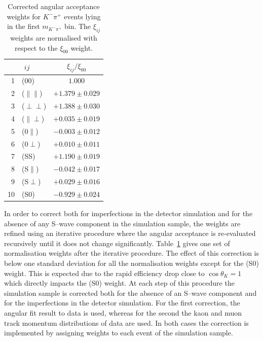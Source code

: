 \documentclass[12pt,a4paper]{article}
\def\thetaK{\ensuremath{\theta_{K}}\xspace}
\newcommand{\mkpi}{\ensuremath{m_{\Km\pip}}\xspace}
\newcommand{\Km}{\ensuremath{K^-}\xspace}
\newcommand{\pip}{\ensuremath{\pi^+}\xspace}
\newcommand{\swave}{{\rm S--wave}\xspace}
\newcommand{\tabref}[1]{Table~\ref{#1}}
\begin{document}
\begin{table}[b!]
  \center
  \caption{\small Corrected angular acceptance weights for $K^-\pi^+$ events lying in the first \mkpi bin.
                  The $\xi_{ij}$ weights are normalised with respect to the $\xi_{00}$ weight. }
 
  \begin{tabular}{r l c}
    \hline
    \multicolumn{2}{c}{$ij$}        &  $\xi_{ij}/\xi_{00}$         \\
    \hline
     1   &  (00)                    & $1.000             $\\
     2   &  ($\parallel\parallel$)  & $+1.379 \pm  0.029$   \\
     3   &  ($\perp\perp$)          & $+1.388 \pm  0.030$   \\
     4   &  ($\parallel\perp$)      & $+0.035 \pm  0.019$   \\
     5   &  (0$\parallel$)          & $-0.003 \pm  0.012$   \\
     6   &  (0$\perp$)              & $+0.010 \pm  0.011$   \\
     7   &  (SS)                    & $+1.190 \pm  0.019$   \\
     8   &  (S$\parallel$)          & $-0.042 \pm  0.017$   \\
     9   &  (S$\perp$)              & $+0.029 \pm  0.016$   \\
     10  &  (S0)                    & $-0.929 \pm  0.024$   \\
    \hline
  \end{tabular}
  \label{tab:angAccWeightsUncorr}
\end{table}
In order to correct both for imperfections in the detector simulation and for the absence of any \swave component in the
simulation sample, the weights are refined using an iterative procedure where the angular acceptance is re-evaluated
recursively until it does not change significantly. 
\tabref{tab:angAccWeightsUncorr} gives one set of normalisation weights after the iterative procedure.
The effect of this correction is below one standard deviation for all the normalisation weights except for the (S0) weight.
This is expected due to the rapid efficiency drop close to $\cos \thetaK = 1$ which directly impacts the (S0) weight.
At each step of this procedure
the simulation sample is corrected both for the absence of an \swave component and for the imperfections in the detector simulation.
For the first correction, the angular fit result to data is used, whereas for the second the kaon and muon track momentum distributions of data are used.
In both cases the correction is implemented by assigning weights to each event of the simulation sample.
\end{document}
